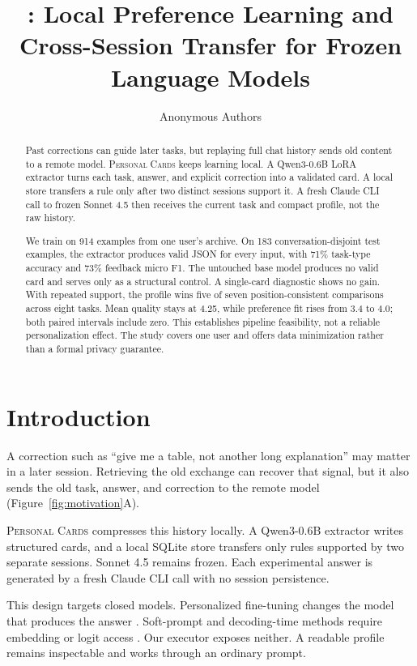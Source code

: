 \documentclass{article}
\title{\method: Local Preference Learning and Cross-Session Transfer for Frozen Language Models}
\author{Anonymous Authors}
\newcommand{\method}{\textsc{Personal Cards}}
\begin{document}
\maketitle

\begin{abstract}
Past corrections can guide later tasks, but replaying full chat history sends
old content to a remote model. \method{} keeps learning local. A Qwen3-0.6B
LoRA extractor turns each task, answer, and explicit correction into a
validated card. A local store transfers a rule only after two distinct sessions
support it. A fresh Claude CLI call to frozen Sonnet 4.5 then receives the
current task and compact profile, not the raw history.

We train on 914 examples from one user's archive. On 183
conversation-disjoint test examples, the extractor produces valid JSON for
every input, with 71\% task-type accuracy and 73\% feedback micro F1. The
untouched base model produces no valid card and serves only as a structural
control. A single-card diagnostic shows no gain. With repeated support, the
profile wins five of seven position-consistent comparisons across eight tasks.
Mean quality stays at 4.25, while preference fit rises from 3.4 to 4.0; both
paired intervals include zero. This establishes pipeline feasibility, not a
reliable personalization effect. The study covers one user and offers data
minimization rather than a formal privacy guarantee.
\end{abstract}

\section{Introduction}
\label{sec:introduction}

A correction such as ``give me a table, not another long explanation'' may
matter in a later session. Retrieving the old exchange can recover that signal,
but it also sends the old task, answer, and correction to the remote model
(Figure~\ref{fig:motivation}A).

\method{} compresses this history locally. A Qwen3-0.6B extractor writes
structured cards, and a local SQLite store transfers only rules supported by
two separate sessions. Sonnet 4.5 remains frozen. Each experimental answer is
generated by a fresh Claude CLI call with no session persistence.

This design targets closed models. Personalized fine-tuning changes the model
that produces the answer \citep{li2024personalizedrlhf}. Soft-prompt and
decoding-time methods require embedding or logit access
\citep{hebert2024persoma,lv2025costeer}. Our executor exposes neither. A
readable profile remains inspectable and works through an ordinary prompt.
\end{document}
